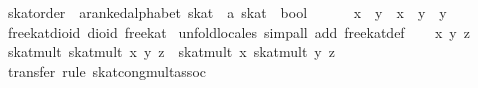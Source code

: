 \begin{isabellebody}
\isanewline
{}\isamarkupfalse%
\ skat{}order\ {}{}\ {}{}a{}{}ranked{}alphabet\ skat\ {}\ {}a\ skat\ {}\ bool{}\ {}\ {}{}{}\ {}{}{}\ \isanewline
\ \ {}x\ {}\ y\ {}\ x\ {}\ y\ {}\ y{}\isanewline
\isanewline
{}\isamarkupfalse%
\ free{}kat{}dioid{}\ {}dioid\ free{}kat{}\isanewline
%
\isadelimproof
%
\endisadelimproof
%
\isatagproof
{}\isamarkupfalse%
\ {}unfold{}locales{}\ simp{}all\ add{}\ free{}kat{}def{}\isanewline
\ \ \isamarkupfalse%
\ x\ y\ z\isanewline
\ \ \isamarkupfalse%
\ {}skat{}mult\ {}skat{}mult\ x\ y{}\ z\ {}\ skat{}mult\ x\ {}skat{}mult\ y\ z{}{}\isanewline
\ \ \ \ \isamarkupfalse%
\ {}transfer{}\ rule\ skat{}cong{}mult{}assoc{}\isanewline

\end{isabellebody}
